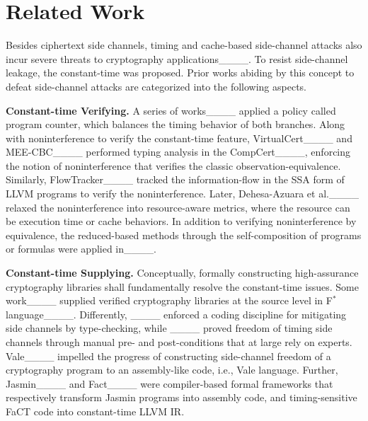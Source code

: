 \section{Related Work}
\label{sec:related}

Besides ciphertext side channels, timing and cache-based side-channel attacks also incur severe threats to cryptography applications____. 
To resist side-channel leakage, the constant-time was proposed.
Prior works abiding by this concept to defeat side-channel attacks are categorized into the following aspects.


\noindent \textbf{Constant-time Verifying.}
A series of works____ applied a policy called program counter, which balances the timing behavior of both branches.
Along with noninterference to verify the constant-time feature, VirtualCert____ and MEE-CBC____ performed typing analysis in the CompCert____, enforcing the notion of noninterference that verifies the classic observation-equivalence.
Similarly, FlowTracker____ tracked the information-flow in the SSA form of LLVM programs to verify the noninterference.
Later, Dehesa-Azuara et al.____ relaxed the noninterference into resource-aware metrics, where the resource can be execution time or cache behaviors.
In addition to verifying noninterference by equivalence, the reduced-based methods through the self-composition of programs or formulas were applied in____.

\noindent \textbf{Constant-time Supplying.}
Conceptually, formally constructing high-assurance cryptography libraries shall fundamentally resolve the constant-time issues. 
Some work____ supplied verified cryptography libraries at the source level in F$^{*}$ language____.
Differently, ____ enforced a coding discipline for mitigating side channels by type-checking, while ____ proved freedom of timing side channels through manual pre- and post-conditions that at large rely on experts. 
Vale____ impelled the progress of constructing side-channel freedom of a cryptography program to an assembly-like code, i.e., Vale language. 
Further, Jasmin____ and Fact____ were compiler-based formal frameworks that respectively transform Jasmin programs into assembly code, and timing-sensitive FaCT code into constant-time LLVM IR.


